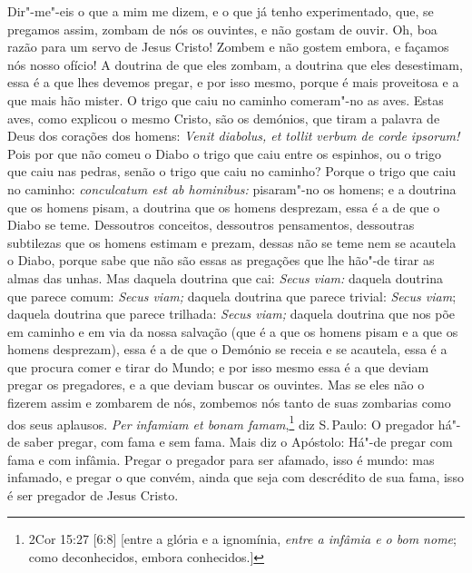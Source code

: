 Dir"-me"-eis o que a mim me dizem, e o que já tenho experimentado, que,
se pregamos assim, zombam de nós os ouvintes, e não gostam de ouvir. Oh,
boa razão para um servo de Jesus Cristo! Zombem e não gostem embora, e
façamos nós nosso ofício! A doutrina de que eles zombam, a doutrina que
eles desestimam, essa é a que lhes devemos pregar, e por isso mesmo,
porque é mais proveitosa e a que mais hão mister. O trigo que caiu no
caminho comeram"-no as aves. Estas aves, como explicou o mesmo Cristo,
são os demónios, que tiram a palavra de Deus dos corações dos homens:
\emph{Venit diabolus, et tollit verbum de corde ipsorum!} Pois por que
não comeu o Diabo o trigo que caiu entre os espinhos, ou o trigo que
caiu nas pedras, senão o trigo que caiu no caminho? Porque o trigo
que caiu no caminho: \emph{conculcatum est ab hominibus:} pisaram"-no
os homens; e a doutrina que os homens pisam, a doutrina que os homens
desprezam, essa é a de que o Diabo se teme. Dessoutros conceitos,
dessoutros pensamentos, dessoutras subtilezas que os homens estimam e
prezam, dessas não se teme nem se acautela o Diabo, porque sabe que não
são essas as pregações que lhe hão"-de tirar as almas das unhas. Mas
daquela doutrina que cai: \emph{Secus viam:} daquela doutrina que
parece comum: \emph{Secus viam;} daquela doutrina que parece trivial:
\emph{Secus viam}; daquela doutrina que parece trilhada: \emph{Secus
viam;} daquela doutrina que nos põe em caminho e em via da nossa
salvação (que é a que os homens pisam e a que os homens desprezam), essa
é a de que o Demónio se receia e se acautela, essa é a que procura comer
e tirar do Mundo; e por isso mesmo essa é a que deviam pregar os
pregadores, e a que deviam buscar os ouvintes. Mas se eles não o fizerem
assim e zombarem de nós, zombemos nós tanto de suas zombarias como dos
seus aplausos. \emph{Per infamiam et bonam famam},\footnote{2Cor 15:27 [6:8] [entre a glória e a ignomínia, \emph{entre a infâmia e o bom nome}; como deconhecidos,
embora conhecidos.]} diz S.\,Paulo: O
pregador há"-de saber pregar, com fama e sem fama. Mais diz o
Apóstolo: Há"-de pregar com fama e com infâmia. Pregar o pregador para
ser afamado, isso é mundo: mas
infamado, e pregar o que convém, ainda que seja com descrédito de sua
fama, isso é ser pregador de Jesus Cristo.

